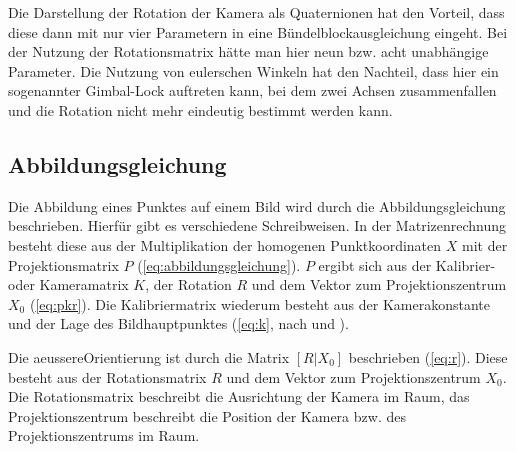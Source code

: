 \documentclass[./00PhotoBox.tex]{subfiles}
\begin{document}
Die Darstellung der Rotation der Kamera als Quaternionen hat den Vorteil, dass diese dann mit nur vier Parametern in eine Bündelblockausgleichung eingeht. Bei der Nutzung der Rotationsmatrix hätte man hier neun bzw. acht unabhängige Parameter. Die Nutzung von eulerschen Winkeln hat den Nachteil, dass hier ein sogenannter Gimbal-Lock auftreten kann, bei dem zwei Achsen zusammenfallen und die Rotation nicht mehr eindeutig bestimmt werden kann. \citep[S. 63]{luhmann}

\subsection{Abbildungsgleichung}
\label{ss:abbildungsgleichung}
Die Abbildung eines Punktes auf einem Bild wird durch die Abbildungsgleichung beschrieben. Hierfür gibt es verschiedene Schreibweisen. In der Matrizenrechnung besteht diese aus der Multiplikation der homogenen Punktkoordinaten $X$ mit der Projektionsmatrix $P$ (\autoref{eq:abbildungsgleichung}). $P$ ergibt sich aus der Kalibrier- oder Kameramatrix $K$, der Rotation $R$ und dem Vektor zum Projektionszentrum $X_0$ (\autoref{eq:pkr}). Die Kalibriermatrix wiederum besteht aus der \Gls{Kamerakonstante} und der Lage des \Gls{Bildhauptpunkt}es (\autoref{eq:k}, nach \citealp[S. 244]{hartley} und \citealp[S. 290]{luhmann}).

Die \gls{aeussereOrientierung} ist durch die Matrix $[R|X_0]$ beschrieben (\autoref{eq:r}). Diese besteht aus der Rotationsmatrix $R$ und dem Vektor zum Projektionszentrum $X_0$. Die Rotationsmatrix beschreibt die Ausrichtung der Kamera im Raum, das Projektionszentrum beschreibt die Position der Kamera bzw. des Projektionszentrums im Raum.
\end{document}
